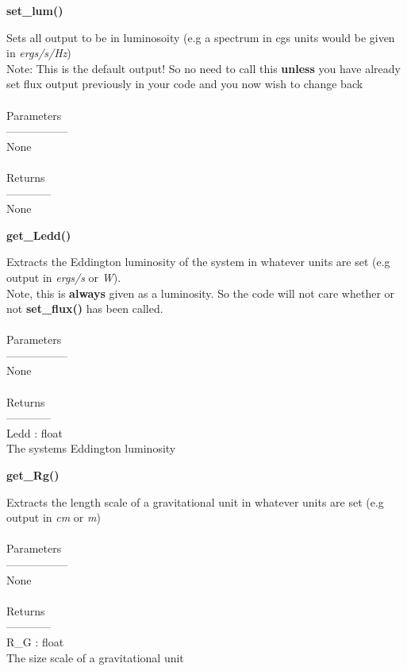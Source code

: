 \documentclass[a4paper, 11pt, times, onecolumn]{article}
\begin{document}
\vspace{1cm}

\noindent
{\bf set\_lum()}
\begin{adjustwidth}{1.5cm}{}
	
	\noindent
	Sets all output to be in luminosoity (e.g a spectrum in cgs units would be given in {\it ergs/s/Hz}) \\
	Note: This is the default output! So no need to call this {\bf unless} you have already set flux output previously in your code and you now wish to change back
	\\~\\
	Parameters\\
	-----------------\\
	\indent None
	\\~\\
	Returns \\
	------------\\ 
	\indent None 
	
\end{adjustwidth}

\vspace{1cm}

\noindent
{\bf get\_Ledd()}
\begin{adjustwidth}{1.5cm}{}

	\noindent
	Extracts the Eddington luminosity of the system in whatever units are set (e.g output in {\it ergs/s} or {\it W}). \\
	Note, this is {\bf always} given as a luminosity. So the code will not care whether or not {\bf set\_flux()} has been called.
	\\~\\
	Parameters\\
	-----------------\\
	\indent None
	\\~\\
	Returns \\
	------------\\ 
	\indent Ledd : float \\
	\indent \indent The systems Eddington luminosity

\end{adjustwidth}

\vspace{1cm}

\noindent
{\bf get\_Rg()}
\begin{adjustwidth}{1.5cm}{}

	\noindent
	Extracts the length scale of a gravitational unit in whatever units are set (e.g output in {\it cm} or {\it m})
	\\~\\
	Parameters\\
	-----------------\\
	\indent None
	\\~\\
	Returns \\
	------------\\ 
	\indent R\_G : float \\
	\indent \indent The size scale of a gravitational unit

\end{adjustwidth}
\end{document}
